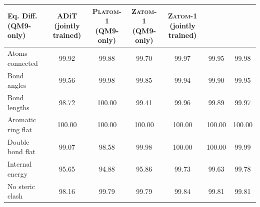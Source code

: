 \documentclass{article}
\theoremstyle{plain}
\theoremstyle{definition}
\theoremstyle{remark}
\begin{document}
\begin{table}[!ht]
\begin{minipage}[t]{0.85\textwidth}
{\begin{tabular}{lcccccc}
    \makecell{\textbf{Eq. Diff.}         \\[1pt] \footnotesize (QM9-only)} &
    \makecell{\textbf{ADiT}              \\[1pt] \footnotesize (jointly trained)} &
    \makecell{\textbf{\textsc{Platom-1}} \\[1pt] \footnotesize (QM9-only)} &
    \makecell{\textbf{\textsc{Zatom-1}}  \\[1pt] \footnotesize (QM9-only)} &
    \makecell{\textbf{\textsc{Zatom-1}}  \\[1pt] \footnotesize (jointly trained)} \\
    \midrule
    Atoms connected    &  99.92 &  99.88 &  99.70 &  99.97 &  99.95 &  99.98 \\
    Bond angles        &  99.56 &  99.98 &  99.85 &  99.94 &  99.90 &  99.95 \\
    Bond lengths       &  98.72 & 100.00 &  99.41 &  99.96 &  99.89 &  99.97 \\
    Aromatic ring flat & 100.00 & 100.00 & 100.00 & 100.00 & 100.00 & 100.00 \\
    Double bond flat   &  99.07 &  98.58 &  99.98 & 100.00 & 100.00 &  99.99 \\
    Internal energy    &  95.65 &  94.88 &  95.86 &  99.73 &  99.63 &  99.78 \\
    No steric clash    &  98.16 &  99.79 &  99.79 &  99.84 &  99.81 &  99.81 \\
    \bottomrule
    \end{tabular}%
    }
\end{minipage}
\end{table}
\end{document}
